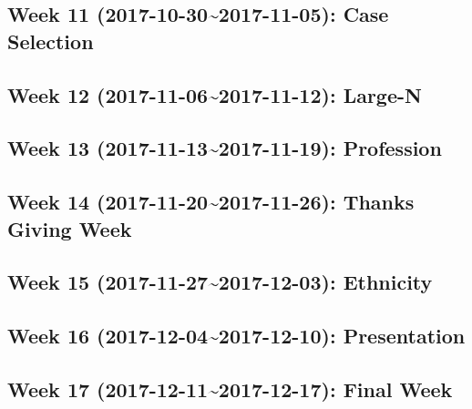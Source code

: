 \documentclass[11pt,]{article}
\begin{document}
\subsection{Week 11 (2017-10-30\textasciitilde{}2017-11-05): Case
Selection}\label{week-11-2017-10-302017-11-05-case-selection}

\subsection{Week 12 (2017-11-06\textasciitilde{}2017-11-12):
Large-N}\label{week-12-2017-11-062017-11-12-large-n}

\subsection{Week 13 (2017-11-13\textasciitilde{}2017-11-19):
Profession}\label{week-13-2017-11-132017-11-19-profession}

\subsection{Week 14 (2017-11-20\textasciitilde{}2017-11-26): Thanks
Giving Week}\label{week-14-2017-11-202017-11-26-thanks-giving-week}

\subsection{Week 15 (2017-11-27\textasciitilde{}2017-12-03):
Ethnicity}\label{week-15-2017-11-272017-12-03-ethnicity}

\subsection{Week 16 (2017-12-04\textasciitilde{}2017-12-10):
Presentation}\label{week-16-2017-12-042017-12-10-presentation}

\subsection{Week 17 (2017-12-11\textasciitilde{}2017-12-17): Final
Week}\label{week-17-2017-12-112017-12-17-final-week}
\end{document}
